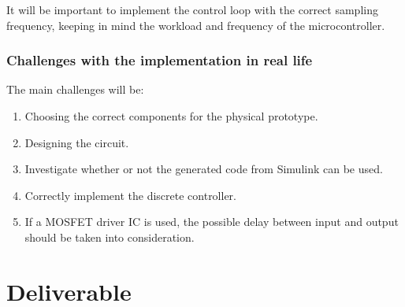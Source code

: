 \documentclass[]{report}
\begin{document}
It will be important to implement the control loop with the correct sampling frequency, keeping in mind the workload and frequency of the microcontroller.

\subsection{Challenges with the implementation in real life}
The main challenges will be:
\begin{enumerate}
	\item Choosing the correct components for the physical prototype.
	\item Designing the circuit.
	\item Investigate whether or not the generated code from Simulink can be used.
	\item Correctly implement the discrete controller.
	\item If a MOSFET driver IC is used, the possible delay between input and output should be taken into consideration.
\end{enumerate}

\chapter{Deliverable}


\printbibliography
\end{document}
